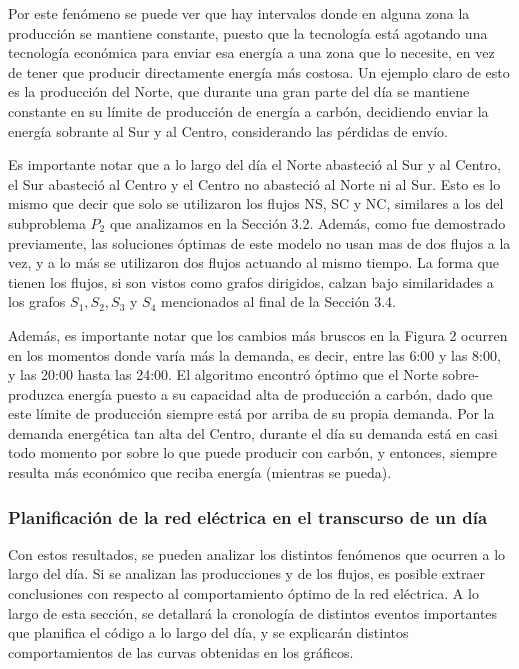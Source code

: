 \documentclass[12pt,twoside]{article}
\begin{document}
	\hspace{1cm} Por este fen\'omeno se puede ver que hay intervalos donde en alguna zona la producci\'on se mantiene constante, puesto que la tecnolog\'ia est\'a agotando una tecnolog\'ia econ\'omica para enviar esa energ\'ia a una zona que lo necesite, en vez de tener que producir directamente energ\'ia m\'as costosa. Un ejemplo claro de esto es la producci\'on del Norte, que durante una gran parte del d\'ia se mantiene constante en su l\'imite de producci\'on de energ\'ia a carb\'on, decidiendo enviar la energ\'ia sobrante al Sur y al Centro, considerando las p\'erdidas de env\'io.
	
	\hspace{1cm} Es importante notar que a lo largo del d\'ia el Norte abasteci\'o al Sur y al Centro, el Sur abasteci\'o al Centro y el Centro no abasteci\'o al Norte ni al Sur. Esto es lo mismo que decir que solo se utilizaron los flujos NS, SC y NC, similares a los del subproblema \(P_2\) que analizamos en la Secci\'on 3.2. Adem\'as, como fue demostrado previamente, las soluciones \'optimas de este modelo no usan mas de dos flujos a la vez, y a lo m\'as se utilizaron dos flujos actuando al mismo tiempo. La forma que tienen los flujos, si son vistos como grafos dirigidos, calzan bajo similaridades a los grafos \(S_1, S_2, S_3\) y \(S_4\) mencionados al final de la Secci\'on 3.4.
	
	\hspace{1cm} Adem\'as, es importante notar que los cambios m\'as bruscos en la Figura 2 ocurren en los momentos donde var\'ia m\'as la demanda, es decir, entre las 6:00 y las 8:00, y las 20:00 hasta las 24:00. El algoritmo encontr\'o \'optimo que el Norte sobre-produzca energ\'ia puesto a su capacidad alta de producci\'on a carb\'on, dado que este l\'imite de producci\'on siempre est\'a por arriba de su propia demanda. Por la demanda energ\'etica tan alta del Centro, durante el d\'ia su demanda est\'a en casi todo momento por sobre lo que puede producir con carb\'on, y entonces, siempre resulta m\'as econ\'omico que reciba energ\'ia (mientras se pueda).
	
	\subsubsection{Planificaci\'on de la red el\'ectrica en el transcurso de un d\'ia}
	\hspace{1cm} Con estos resultados, se pueden analizar los distintos fen\'omenos que ocurren a lo largo del d\'ia. Si se analizan las producciones y de los flujos, es posible extraer conclusiones con respecto al comportamiento \'optimo de la red el\'ectrica. A lo largo de esta secci\'on, se detallar\'a la cronolog\'ia de distintos eventos importantes que planifica el c\'odigo a lo largo del d\'ia, y se explicar\'an distintos comportamientos de las curvas obtenidas en los gr\'aficos.
	
\end{document}
